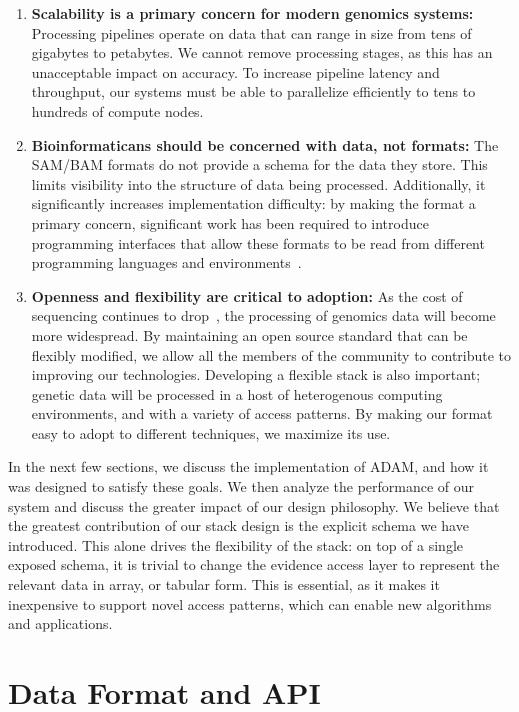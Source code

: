 \documentclass[10pt,twocolumn]{article}
\theoremstyle{plain}
\begin{document}
\begin{enumerate}
\item {\bf Scalability is a primary concern for modern genomics systems:} Processing pipelines operate on data that can range in size from
tens of gigabytes to petabytes. We cannot remove processing stages, as this has an unacceptable impact on accuracy. To increase
pipeline latency and throughput, our systems must be able to parallelize efficiently to tens to hundreds of compute nodes.
\item {\bf Bioinformaticans should be concerned with data, not formats:} The SAM/BAM formats do not provide a schema for the data they
store. This limits visibility into the structure of data being processed. Additionally, it significantly increases implementation difficulty: by
making the format a primary concern, significant work has been required to introduce programming interfaces that allow these formats to
be read from different programming languages and environments~\cite{li09,picard,niemenmaa12}.
\item {\bf Openness and flexibility are critical to adoption:} As the cost of sequencing continues to drop~\cite{nhgri}, the processing of genomics
data will become more widespread. By maintaining an open source standard that can be flexibly modified, we allow all the members of the
community to contribute to improving our technologies. Developing a flexible stack is also important; genetic data will be processed in a host
of heterogenous computing environments, and with a variety of access patterns. By making our format easy to adopt to different techniques, we
maximize its use.
\end{enumerate}

In the next few sections, we discuss the implementation of ADAM, and how it was designed to satisfy these goals. We then
analyze the performance of our system and discuss the greater impact of our design philosophy. We believe that the greatest contribution of
our stack design is the explicit schema we have introduced. This alone drives the flexibility of the stack: on top of a single exposed schema, it
is trivial to change the evidence access layer to represent the relevant data in array, or tabular form. This is essential, as it makes it inexpensive
to support novel access patterns, which can enable new algorithms and applications.

\section{Data Format and API}
\label{sec:data-format-and-api}
\end{document}
